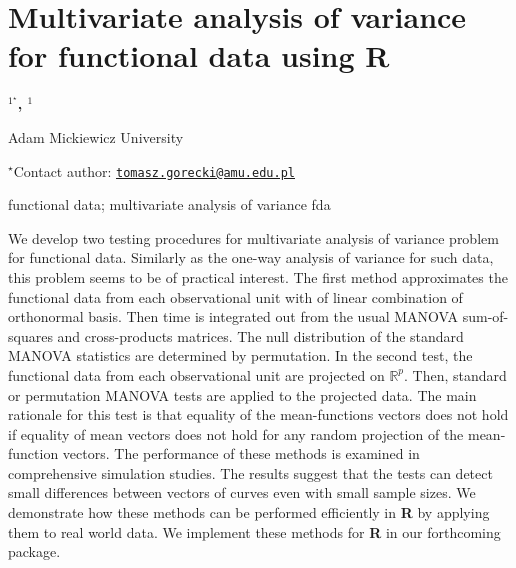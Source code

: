 \documentclass[\main/boa.tex]{subfiles}
\begin{document}
\section{Multivariate analysis of variance for functional data using R}

\begin{center}
  {\bf {}$^{1^\star}$, $^{1}$}
\end{center}

\vskip 0.3cm

\begin{affiliations}
\begin{enumerate}
\begin{minipage}{0.915\textwidth}
\centering
\item Adam Mickiewicz University \\[-2pt]
\end{minipage}
\end{enumerate}
$^\star$Contact author: \href{mailto:tomasz.gorecki@amu.edu.pl}{\nolinkurl{tomasz.gorecki@amu.edu.pl}}\\
\end{affiliations}

\vskip 0.5cm

\begin{minipage}{0.915\textwidth}
\keywords functional data; multivariate analysis of variance
\packages fda
\end{minipage}

\vskip 0.8cm

We develop two testing procedures for multivariate analysis of variance
problem for functional data. Similarly as the one-way analysis of
variance for such data, this problem seems to be of practical interest.
The first method approximates the functional data from each
observational unit with of linear combination of orthonormal basis. Then
time is integrated out from the usual MANOVA sum-of-squares and
cross-products matrices. The null distribution of the standard MANOVA
statistics are determined by permutation. In the second test, the
functional data from each observational unit are projected on
\(\mathbb{R}^p\). Then, standard or permutation MANOVA tests are applied
to the projected data. The main rationale for this test is that equality
of the mean-functions vectors does not hold if equality of mean vectors
does not hold for any random projection of the mean-function vectors.
The performance of these methods is examined in comprehensive simulation
studies. The results suggest that the tests can detect small differences
between vectors of curves even with small sample sizes. We demonstrate
how these methods can be performed efficiently in \textbf{R} by applying
them to real world data. We implement these methods for \textbf{R} in
our forthcoming package.
\end{document}

